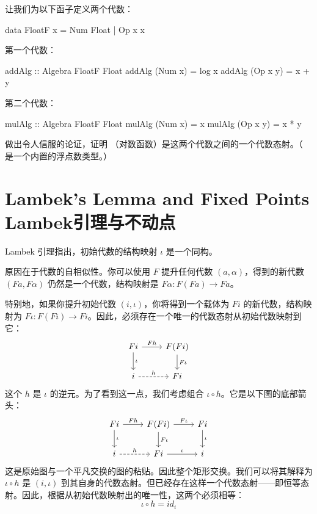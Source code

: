 \documentclass[DaoFP]{subfiles}
\begin{document}
 \begin{exercise}
  让我们为以下函子定义两个代数：
  \begin{haskell}
   data FloatF x = Num Float | Op x x
  \end{haskell}
  第一个代数：
  \begin{haskell}
   addAlg :: Algebra FloatF Float
   addAlg (Num x) = log x
   addAlg (Op x y) = x + y
  \end{haskell}
  第二个代数：
  \begin{haskell}
   mulAlg :: Algebra FloatF Float
   mulAlg (Num x) = x
   mulAlg (Op x y) = x * y
  \end{haskell}
  做出令人信服的论证，证明 （对数函数）是这两个代数之间的一个代数态射。（ 是一个内置的浮点数类型。）
 \end{exercise}

 \section{Lambek's Lemma and Fixed Points Lambek引理与不动点}


 Lambek 引理指出，初始代数的结构映射 $\iota$ 是一个同构。

 原因在于代数的自相似性。你可以使用 $F$ 提升任何代数 $(a, \alpha)$，得到的新代数 $(F a, F \alpha)$ 仍然是一个代数，结构映射是 $F \alpha \colon F (F a) \to F a$。

 特别地，如果你提升初始代数 $(i, \iota)$，你将得到一个载体为 $F i$ 的新代数，结构映射为 $F \iota \colon F (F i) \to F i$。因此，必须存在一个唯一的代数态射从初始代数映射到它：
 \[
  \begin{tikzcd}
   F i
   \arrow[r, "F h"]
   \arrow[d, "\iota"]
   & F (F i)
   \arrow[d, "F \iota"]
   \\
   i
   \arrow[r, dashed, "h"]
   & F i
  \end{tikzcd}
 \]
 这个 $h$ 是 $\iota$ 的逆元。为了看到这一点，我们考虑组合 $\iota \circ h$。它是以下图的底部箭头：
 \[
  \begin{tikzcd}
   F i
   \arrow[r, "F h"]
   \arrow[d, "\iota"]
   & F (F i)
   \arrow[d, "F \iota"]
   \arrow[r, "F \iota"]
   & F i
   \arrow[d, "\iota"]
   \\
   i
   \arrow[r, dashed, "h"]
   & F i
   \arrow[r, "\iota"]
   & i
  \end{tikzcd}
 \]
 这是原始图与一个平凡交换的图的粘贴。因此整个矩形交换。我们可以将其解释为 $\iota \circ h$ 是 $(i, \iota)$ 到其自身的代数态射。但已经存在这样一个代数态射——即恒等态射。因此，根据从初始代数映射出的唯一性，这两个必须相等：
 \[ \iota \circ h = id_i \]
\end{document}
